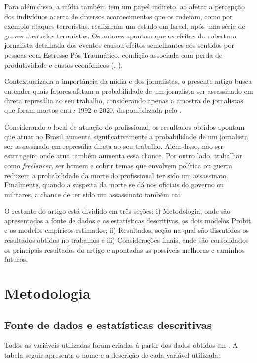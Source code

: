 \documentclass[12pt,
               openright,
               oneside,
               a4paper,
							 section=TITLE,     %
               subsection=Title,  %
               english,brazil]{article}
\begin{document}
Para além disso, a mídia também tem um papel indireto, ao afetar a percepção dos indivíduos acerca de diversos acontecimentos que os rodeiam, como por exemplo ataques terroristas.  realizaram um estudo em Israel, após uma série de graves atentados terroristas. Os autores apontam que os efeitos da cobertura jornalista detalhada dos eventos causou efeitos semelhantes aos sentidos por pessoas com Estresse Pós-Traumático, condição associada com perda de produtividade e custos econômicos (\cite{Ferry2015}, \cite{Olesen2011}).

Contextualizada a importância da mídia e dos jornalistas, o presente artigo busca entender quais fatores afetam a probabilidade de um jornalista ser assassinado em direta represália ao seu trabalho, considerando apenas a amostra de jornalistas que foram mortos entre 1992 e 2020, disponibilizada pelo \cite{CPJ2020}.

Considerando o local de atuação do profissional, os resultados obtidos apontam que atuar no Brasil aumenta significativamente a probabilidade de um jornalista ser assassinado em represália direta ao seu trabalho. Além disso, não ser estrangeiro onde atua também aumenta essa chance. Por outro lado, trabalhar como \textit{freelancer}, ser homem e cobrir temas que envolvem política ou guerra reduzem a probabilidade da morte do profissional ter sido um assassinato. Finalmente, quando a suspeita da morte se dá nos oficiais do governo ou militares, a chance de ter sido um assassinato também cai.

O restante do artigo está dividido em três seções: i) Metodologia, onde são apresentados a fonte de dados e as estatísticas descritivas, os dois modelos Probit e os modelos empíricos estimados; ii) Resultados, seção na qual são discutidos os resultados obtidos no trabalhos e iii) Considerações finais, onde são consolidados os principais resultados do artigo e apontadas as possíveis melhoras e caminhos futuros.

\section{Metodologia}

\subsection{Fonte de dados e estatísticas descritivas}

Todos as variáveis utilizadas foram criadas à partir dos dados obtidos em \cite{CPJ2020}. A tabela seguir apresenta o nome e a descrição de cada variável utilizada:
\end{document}
